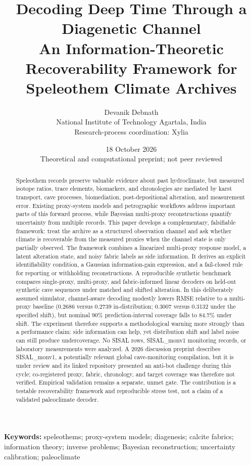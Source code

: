 \documentclass[11pt,a4paper]{article}
\title{\vspace{-1.2em}\textbf{Decoding Deep Time Through a Diagenetic Channel}\\[0.45em]
\large An Information-Theoretic Recoverability Framework for Speleothem Climate Archives}
\author{Devanik Debnath\\\small National Institute of Technology Agartala, India\\\small Research-process coordination: Xylia}
\date{18 October 2026\\[0.2em]\small Theoretical and computational preprint; not peer reviewed}
\begin{document}
\maketitle
\begin{abstract}
Speleothem records preserve valuable evidence about past hydroclimate, but measured isotope ratios, trace elements, biomarkers, and chronologies are mediated by karst transport, cave processes, biomediation, post-depositional alteration, and measurement error. Existing proxy-system models and petrographic workflows address important parts of this forward process, while Bayesian multi-proxy reconstructions quantify uncertainty from multiple records. This paper develops a complementary, falsifiable framework: treat the archive as a structured observation channel and ask whether climate is recoverable from the measured proxies when the channel state is only partially observed. The framework combines a linearized multi-proxy response model, a latent alteration state, and noisy fabric labels as side information. It derives an explicit identifiability condition, a Gaussian information-gain expression, and a fail-closed rule for reporting or withholding reconstructions. A reproducible synthetic benchmark compares single-proxy, multi-proxy, and fabric-informed linear decoders on held-out synthetic cave sequences under matched and shifted alteration. In this deliberately assumed simulator, channel-aware decoding modestly lowers RMSE relative to a multi-proxy baseline (0.2686 versus 0.2739 in-distribution; 0.3007 versus 0.3132 under the specified shift), but nominal 90\% prediction-interval coverage falls to 84.7\% under shift. The experiment therefore supports a methodological warning more strongly than a performance claim: side information can help, yet distribution shift and label noise can still produce undercoverage. No SISAL rows, SISAL\_monv1 monitoring records, or laboratory measurements were analyzed. A 2026 discussion preprint describes SISAL\_monv1, a potentially relevant global cave-monitoring compilation, but it is under review and its linked repository presented an anti-bot challenge during this cycle; co-registered proxy, fabric, chronology, and target coverage was therefore not verified. Empirical validation remains a separate, unmet gate. The contribution is a testable recoverability framework and reproducible stress test, not a claim of a validated paleoclimate decoder.
\end{abstract}
\noindent\textbf{Keywords:} speleothems; proxy-system models; diagenesis; calcite fabrics; information theory; inverse problems; Bayesian reconstruction; uncertainty calibration; paleoclimate
\end{document}
